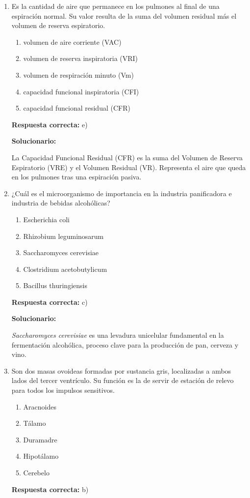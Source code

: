 \begin{enumerate}[resume]

	\item Es la cantidad de aire que permanece en los pulmones al final de una espiración normal. Su valor resulta de la suma del volumen residual más el volumen de reserva espiratorio.
	\begin{enumerate}[label=\alph*)]
		\item volumen de aire corriente (VAC)
		\item volumen de reserva inspiratoria (VRI)
		\item volumen de respiración minuto (Vm)
		\item capacidad funcional inspiratoria (CFI)
		\item capacidad funcional residual (CFR)
	\end{enumerate}
	\textbf{Respuesta correcta:} e)

	\vspace{2mm}
	\textbf{Solucionario:}

	La Capacidad Funcional Residual (CFR) es la suma del Volumen de Reserva Espiratorio (VRE) y el Volumen Residual (VR). Representa el aire que queda en los pulmones tras una espiración pasiva.

	\vspace{6mm}

	\item ¿Cuál es el microorganismo de importancia en la industria panificadora e industria de bebidas alcohólicas?
	\begin{enumerate}[label=\alph*)]
		\item Escherichia coli
		\item Rhizobium leguminosarum
		\item Saccharomyces cerevisiae
		\item Clostridium acetobutylicum
		\item Bacillus thuringiensis
	\end{enumerate}
	\textbf{Respuesta correcta:} c)

	\vspace{2mm}
	\textbf{Solucionario:}

	\textit{Saccharomyces cerevisiae} es una levadura unicelular fundamental en la fermentación alcohólica, proceso clave para la producción de pan, cerveza y vino.

	\vspace{6mm}

	\item Son dos masas ovoideas formadas por sustancia gris, localizadas a ambos lados del tercer ventrículo. Su función es la de servir de estación de relevo para todos los impulsos sensitivos.
	\begin{enumerate}[label=\alph*)]
		\item Aracnoides
		\item Tálamo
		\item Duramadre
		\item Hipotálamo
		\item Cerebelo
	\end{enumerate}
	\textbf{Respuesta correcta:} b)


\end{enumerate}
